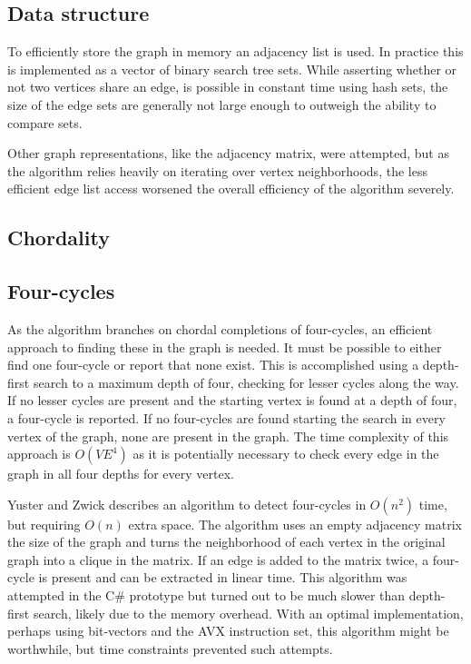 \documentclass{article}
\begin{document}
		\subsection{Data structure}
		To efficiently store the graph in memory an adjacency list is used.
		In practice this is implemented as a vector of binary search tree sets.
		While asserting whether or not two vertices share an edge, is possible in constant time using hash sets, the size of the edge sets are generally not large enough to outweigh the ability to compare sets.

		Other graph representations, like the adjacency matrix, were attempted, but as the algorithm relies heavily on iterating over vertex neighborhoods, the less efficient edge list access worsened the overall efficiency of the algorithm severely.

		\subsection{Chordality}

		\subsection{Four-cycles}
		As the algorithm branches on chordal completions of four-cycles, an efficient approach to finding these in the graph is needed.
		It must be possible to either find one four-cycle or report that none exist.
		This is accomplished using a depth-first search to a maximum depth of four, checking for lesser cycles along the way.
		If no lesser cycles are present and the starting vertex is found at a depth of four, a four-cycle is reported.
		If no four-cycles are found starting the search in every vertex of the graph, none are present in the graph.
		The time complexity of this approach is $O(VE^4)$ as it is potentially necessary to check every edge in the graph in all four depths for every vertex.

		Yuster and Zwick\cite{finding-even-cycles} describes an algorithm to detect four-cycles in $O(n^2)$ time, but requiring $O(n)$ extra space.
		The algorithm uses an empty adjacency matrix the size of the graph and turns the neighborhood of each vertex in the original graph into a clique in the matrix.
		If an edge is added to the matrix twice, a four-cycle is present and can be extracted in linear time.
		This algorithm was attempted in the C\# prototype but turned out to be much slower than depth-first search, likely due to the memory overhead.
		With an optimal implementation, perhaps using bit-vectors and the AVX instruction set, this algorithm might be worthwhile, but time constraints prevented such attempts.
\end{document}
